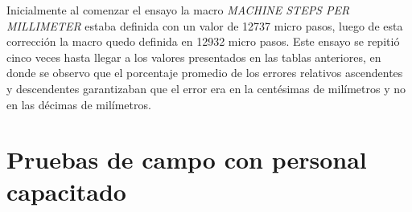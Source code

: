 Inicialmente al comenzar el ensayo la macro \textit{MACHINE STEPS PER MILLIMETER}  estaba definida con un valor de 12737 micro pasos, luego de esta corrección la macro quedo definida en 12932 micro pasos.
Este ensayo se repitió cinco veces hasta llegar a los valores presentados en las tablas anteriores, en donde se observo que el porcentaje promedio de los errores relativos ascendentes y descendentes garantizaban que el error era en la centésimas de milímetros y no en las décimas de milímetros.


\section{Pruebas de campo con personal capacitado}
